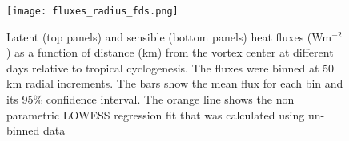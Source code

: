 \documentclass[draft]{agujournal2019}
\begin{document}
\begin{figure}
 \texttt{[image: fluxes\_radius\_fds.png]}
 \caption{Latent (top panels) and sensible (bottom panels) heat fluxes (Wm$^{-2}$) as a function of distance (km) from the vortex center at different days relative to tropical cyclogenesis. The fluxes were binned at 50 km radial increments. The bars show the  mean flux for each bin and its 95\% confidence interval. The orange line shows the non parametric LOWESS regression fit that was calculated using un-binned data}
 \label{fig:flux_rad_comp}
\end{figure}






%
%
%
%

%
%
\end{document}
